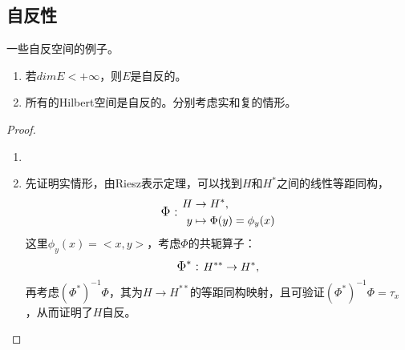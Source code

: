 \subsection{自反性}

\begin{example}
    一些自反空间的例子。
    \begin{enumerate}
        \item 若$dim E<+\infty$，则$E$是自反的。
        \item 所有的Hilbert空间是自反的。分别考虑实和复的情形。
    \end{enumerate}
\end{example}

\begin{proof}
    \begin{enumerate}
        \item 
        \item 先证明实情形，由Riesz表示定理，可以找到$H$和$H^{*}$之间的线性等距同构，
        \begin{equation*}
            \text{\large$\Phi:$\,\,}
            \begin{aligned}
              H&\rightarrow H^{*},\\
              y&\mapsto \Phi(y)=\phi_{y}(x)  
            \end{aligned}
        \end{equation*}
        这里$\phi_{y}(x)=<x,y>$，考虑$\Phi$的共轭算子：
        \begin{equation*}
            \text{\large$\Phi^{*}:$\,\,}
              H^{**}\rightarrow H^{*},
        \end{equation*}
        再考虑$(\Phi^{*})^{-1}\Phi$，其为$H\rightarrow H^{**}$的等距同构映射，且可验证$(\Phi^{*})^{-1}\Phi=\tau_{x}$，从而证明了$H$自反。
    \end{enumerate}
\end{proof}